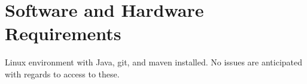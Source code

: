 \documentclass[12pt, a4paper]{article}
\begin{document}
\section*{Software and Hardware Requirements}

Linux environment with Java, git, and maven installed.
No issues are anticipated with regards to access to these.


\printbibliography
\end{document}
